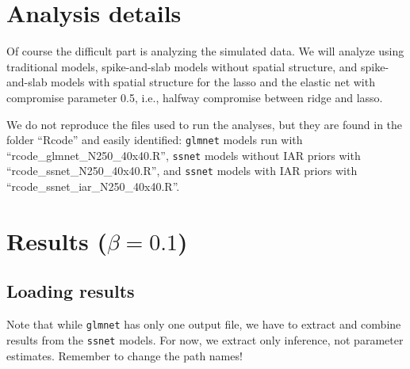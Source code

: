 \documentclass[
]{article}
\begin{document}
\hypertarget{analysis-details}{%
\section{Analysis details}\label{analysis-details}}

Of course the difficult part is analyzing the simulated data. We will
analyze using traditional models, spike-and-slab models without spatial
structure, and spike-and-slab models with spatial structure for the
lasso and the elastic net with compromise parameter 0.5, i.e., halfway
compromise between ridge and lasso.

We do not reproduce the files used to run the analyses, but they are
found in the folder ``Rcode'' and easily identified: \texttt{glmnet}
models run with ``rcode\_glmnet\_N250\_40x40.R'', \texttt{ssnet} models
without IAR priors with ``rcode\_ssnet\_N250\_40x40.R'', and
\texttt{ssnet} models with IAR priors with
``rcode\_ssnet\_iar\_N250\_40x40.R''.

\hypertarget{results-beta-0.1}{%
\section{\texorpdfstring{Results
(\(\beta = 0.1\))}{Results (\textbackslash beta = 0.1)}}\label{results-beta-0.1}}

\hypertarget{loading-results}{%
\subsection{Loading results}\label{loading-results}}

Note that while \texttt{glmnet} has only one output file, we have to
extract and combine results from the \texttt{ssnet} models. For now, we
extract only inference, not parameter estimates. Remember to change the
path names!
\end{document}
